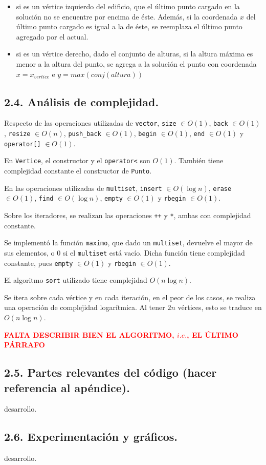 \begin{itemize}
  \item si es un vértice izquierdo del edificio, que el último punto cargado en
  la solución no se encuentre por encima de éste. Además, si la coordenada $x$ 
  del último punto cargado es igual a la de éste, se reemplaza el último punto 
  agregado por el actual.
  
  \item si es un vértice derecho, dado el conjunto de alturas, si la altura 
  máxima es menor a la altura del punto, se agrega a la solución el punto con 
  coordenada $x = x_{vertice}$ e $y = max(conj(altura))$
\end{itemize}
 


\subsection{2.4. Análisis de complejidad.}

\vspace*{0.3cm}

Respecto de las operaciones utilizadas de \verb|vector|, \verb|size| $\in O(1)$,
\verb|back| $\in O(1)$, \verb|resize| $\in O(n)$, \verb|push_back| $\in O(1)$, 
\verb|begin| $\in O(1)$, \verb|end| $\in O(1)$ y \verb|operator[]| $\in O(1)$.

\noindent
En \verb|Vertice|, el constructor y el \verb|operator<| son $O(1)$. También 
tiene complejidad constante el constructor de \verb|Punto|.

\noindent
En las operaciones utilizadas de \verb|multiset|, \verb|insert| $\in O(\log n)$, 
\verb|erase| $\in O(1)$, \verb|find| $\in O(\log n)$, \verb|empty| $\in O(1)$ y 
\verb|rbegin| $\in O(1)$.

\noindent
Sobre los iteradores, se realizan las operaciones \verb|++| y \verb|*|, ambas
con complejidad constante.

\noindent
Se implementó la función \verb|maximo|, que dado un \verb|multiset|, devuelve 
el mayor de sus elementos, o 0 si el \verb|multiset| está vacío. Dicha función
tiene complejidad constante, pues \verb|empty| $\in O(1)$ y \verb|rbegin| $\in O(1)$.

\noindent
El algoritmo \verb|sort| utilizado tiene complejidad $O(n \log n)$.

\noindent
Se itera sobre cada vértice y en cada iteración, en el peor de los casos, se 
realiza una operación de complejidad logarítmica. Al tener $2n$ vértices, esto se
traduce en $O(n \log n)$.


\textcolor{red}{\textbf{FALTA DESCRIBIR BIEN EL ALGORITMO, $i.e.$, EL ÚLTIMO PÁRRAFO}}

\subsection{2.5. Partes relevantes del código (hacer referencia al apéndice).}

\vspace*{0.3cm}

desarrollo.





\subsection{2.6. Experimentación y gráficos.}

\vspace*{0.3cm}

desarrollo.
